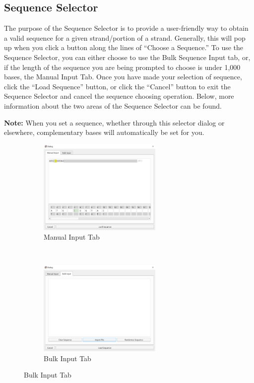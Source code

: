 \documentclass[titlepage]{article}
\begin{document}
\subsection{Sequence Selector} \label{sect:sequence-selector}
	The purpose of the Sequence Selector is to provide a user-friendly way to obtain a valid sequence for a given strand/portion of a strand. Generally, this will pop up when you click a button along the lines of ``Choose a Sequence.'' To use the Sequence Selector, you can either choose to use the Bulk Sequence Input tab, or, if the length of the sequence you are being prompted to choose is under 1,000 bases, the Manual Input Tab. Once you have made your selection of sequence, click the ``Load Sequence'' button, or click the ``Cancel'' button to exit the Sequence Selector and cancel the sequence choosing operation. Below, more information about the two areas of the Sequence Selector can be found.
	
	\textbf{Note:} When you set a sequence, whether through this selector dialog or elsewhere, complementary bases will automatically be set for you.

\begin{figure} \label{fig:sequence-dialog-manual-input}
	\centering
	\caption{Sequence Selector Dialog}
	\begin{subfigure}{.5\textwidth}
		\centering
		\includegraphics[height=1.8in]{sequence-editor-manual-input.png}
		\caption{Manual Input Tab}
	\end{subfigure}%
	~
	\begin{subfigure}{.5\textwidth}
		\centering
		\includegraphics[height=1.8in]{sequence-editor-bulk-input.png}
		\caption{Bulk Input Tab}
		\label{fig:sequence-dialog-bulk-input}
	\end{subfigure}
\end{figure}
\end{document}

